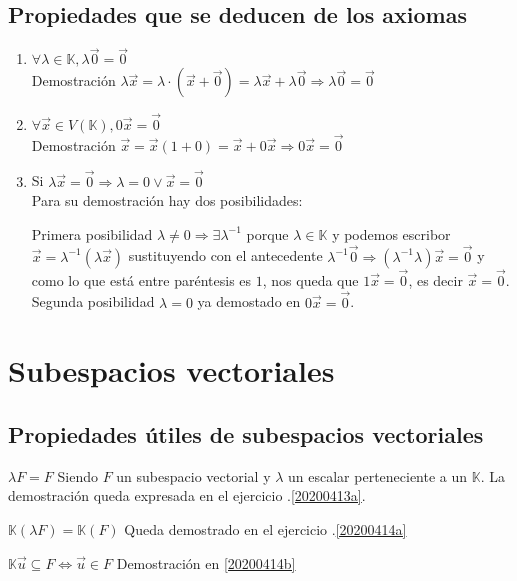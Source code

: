 \section{Propiedades que se deducen de los axiomas}
\begin{enumerate}
	\item $\forall \lambda\in\mathbb{K}, \lambda\vec{0}=\vec{0}$ \\
		Demostración
		$\lambda\vec{x}=\lambda\cdot(\vec{x}+\vec{0})=\lambda\vec{x}+\lambda\vec{0} \Rightarrow
		\lambda\vec{0}=\vec{0}$
	\item $\forall \vec{x}\in V(\mathbb{K}), 0\vec{x}=\vec{0}$ \\
		Demostración
		$\vec{x}=\vec{x}(1+0)=\vec{x}+0\vec{x}\Rightarrow 0\vec{x}=\vec{0}$
	\item Si $\lambda\vec{x}=\vec{0}\Rightarrow\lambda=0 \lor \vec{x}=\vec{0}$ \\
		Para su demostración hay dos posibilidades:
		
		Primera posibilidad $\lambda\neq 0 \Rightarrow \exists\lambda^{-1}$ porque $\lambda\in\mathbb{K}$ y
		podemos escribor $\vec{x}=\lambda^{-1}(\lambda\vec{x})$ sustituyendo con el antecedente 
		$\lambda^{-1}\vec{0} \Rightarrow (\lambda^{-1}\lambda)\vec{x}=\vec{0}$ y como lo que está
		entre paréntesis es $1$, nos queda que $1\vec{x}=\vec{0}$, es decir $\vec{x}=\vec{0}$.\\
		
		Segunda posibilidad $\lambda=0$ ya demostado en $0\vec{x}=\vec{0}$.


\end{enumerate}
\chapter{Subespacios vectoriales}
\section{Propiedades útiles de subespacios vectoriales}
\begin{propiedades}
	\item $\lambda F=F$ Siendo $F$ un subespacio vectorial y $\lambda$ un escalar perteneciente a un
		$\mathbb{K}$. La demostración queda expresada en el ejercicio \thesection.\ref{20200413a}.
	\item $\mathbb{K}(\lambda F)=\mathbb{K}(F)$
		Queda demostrado en el ejercicio \thesection.\ref{20200414a}
	\item $\mathbb{K}\vec{u} \subseteq F \iff \vec{u} \in F$
		Demostración en \ref{20200414b}
\end{propiedades}

